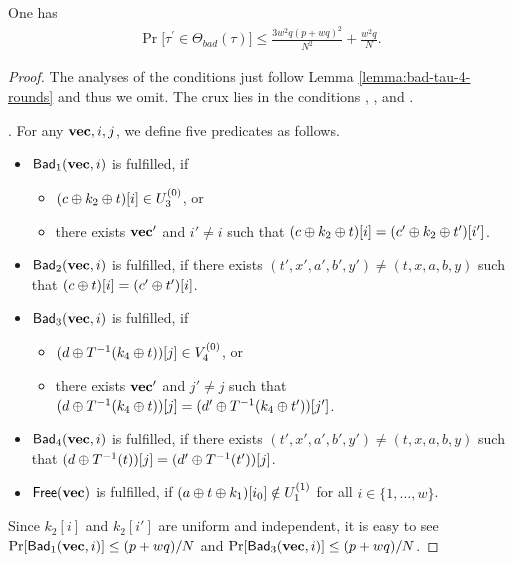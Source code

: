 \begin{lemma}
	\label{lemma:bad-tau-6-rounds}
	
	One has
	\begin{align}
	{\Pr}\big[\tau^{\prime} \in \Theta_{bad}(\tau)\big] \leq \frac{3w^{2} q \left(p+w q\right)^{2}}{N^{2}} + \frac{w^{2} q}{N}.
	\label{eq:bound-bad-tau-6-rounds}
	\end{align}
\end{lemma}
\begin{proof}
The analyses of the conditions just follow Lemma \ref{lemma:bad-tau-4-rounds} and thus we omit. The crux lies in the conditions \cfour, \cfive, and \csix.


\newpage

\arrangespace

\noindent \textsc{\cfour}. For any $\mathbf{vec},i,j$, we define five predicates as follows.
%
\begin{itemize}
	\item $\mathsf{Bad}_1(\mathbf{vec},i)$ is fulfilled, if
	\begin{itemize}
		\item $(c\oplus k_2\oplus t)[i]\in U_3^{(0)}$, or
		\item there exists $\mathbf{vec}'$ and $i'\neq i$ such that $(c\oplus k_2\oplus t)[i]=(c'\oplus k_2\oplus t')[i']$.
	\end{itemize}
	\item $\mathsf{Bad}_2(\mathbf{vec},i)$ is fulfilled, if there exists $(t',x',a',b',y')\neq(t,x,a,b,y)$ such that $(c\oplus t)[i]=(c'\oplus t')[i]$.
	\item $\mathsf{Bad}_3(\mathbf{vec},i)$ is fulfilled, if
	\begin{itemize}
		\item $(d\oplus T^{-1}(k_4\oplus t))[j]\in V_4^{(0)}$, or
		\item there exists $\mathbf{vec}'$ and $j'\neq j$ such that $(d\oplus T^{-1}(k_4\oplus t))[j]=(d'\oplus T^{-1}(k_4\oplus t'))[j']$.
	\end{itemize}
	\item $\mathsf{Bad}_4(\mathbf{vec},i)$ is fulfilled, if there exists $(t',x',a',b',y')\neq(t,x,a,b,y)$ such that $(d\oplus T^{-1}(t))[j]=(d'\oplus T^{-1}(t'))[j]$.
	\item $\mathsf{Free}(\mathbf{vec})$ is fulfilled, if $(a\oplus t\oplus k_1)[i_0]\notin U_1^{(1)}$ for all $i\in\{1,\ldots,w\}$.
\end{itemize}
%
Since $k_2[i]$ and $k_2[i']$ are uniform and independent, it is easy to see $\Pr[\mathsf{Bad}_1(\mathbf{vec},i)]\leq(p+wq)/N$ and $\Pr[\mathsf{Bad}_3(\mathbf{vec},i)]\leq(p+wq)/N$.



\end{proof}
